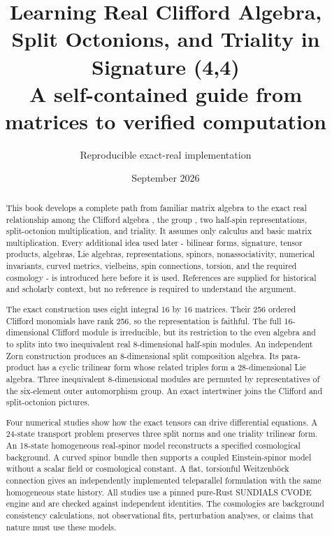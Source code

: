 \documentclass[11pt]{article}
\title{Learning Real Clifford Algebra, Split Octonions, and Triality in Signature (4,4)\\[0.5em]\large A self-contained guide from matrices to verified computation}
\author{Reproducible exact-real implementation}
\date{September 2026}
\begin{document}
\maketitle
\tableofcontents
\newpage
\begin{abstract}
This book develops a complete path from familiar matrix algebra to the exact real relationship among the Clifford algebra \texttt{}, the group \texttt{}, two half-spin representations, split-octonion multiplication, and triality. It assumes only calculus and basic matrix multiplication. Every additional idea used later - bilinear forms, signature, tensor products, algebras, Lie algebras, representations, spinors, nonassociativity, numerical invariants, curved metrics, vielbeins, spin connections, torsion, and the required cosmology - is introduced here before it is used. References are supplied for historical and scholarly context, but no reference is required to understand the argument.

The exact construction uses eight integral 16 by 16 matrices. Their 256 ordered Clifford monomials have rank 256, so the representation is faithful. The full 16-dimensional Clifford module is irreducible, but its restriction to the even algebra and to \texttt{} splits into two inequivalent real 8-dimensional half-spin modules. An independent Zorn construction produces an 8-dimensional split composition algebra. Its para-product has a cyclic trilinear form whose related triples form a 28-dimensional Lie algebra. Three inequivalent 8-dimensional modules are permuted by representatives of the six-element outer automorphism group. An exact intertwiner joins the Clifford and split-octonion pictures.

Four numerical studies show how the exact tensors can drive differential equations. A 24-state transport problem preserves three split norms and one triality trilinear form. An 18-state homogeneous real-spinor model reconstructs a specified cosmological background. A curved \texttt{} spinor bundle then supports a coupled Einstein-spinor model without a scalar field or cosmological constant. A flat, torsionful Weitzenböck connection gives an independently implemented teleparallel formulation with the same homogeneous state history. All studies use a pinned pure-Rust SUNDIALS CVODE engine and are checked against independent identities. The cosmologies are background consistency calculations, not observational fits, perturbation analyses, or claims that nature must use these models.

\end{abstract}
\end{document}
